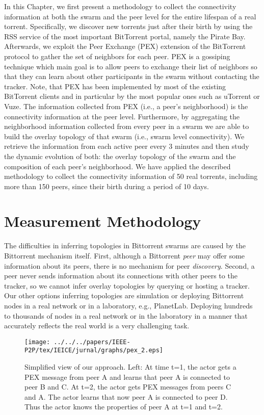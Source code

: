 In this Chapter, we first present a methodology to collect the connectivity information at both the swarm and the peer level for the entire lifespan of a real torrent. Specifically, we discover new torrents just after their birth by using the RSS service of the most important BitTorrent portal, namely the Pirate Bay. 
Afterwards, we exploit the Peer Exchange (PEX) extension of the BitTorrent protocol to gather the set of neighbors for each peer. 
PEX is a gossiping technique which main goal is to allow peers to exchange their list of neighbors so that they can learn about other participants in the swarm without contacting the tracker. 
Note, that PEX has been implemented by most of the existing BitTorrent clients and in particular by the most popular ones such as uTorrent or Vuze. 
The information collected from PEX (i.e., a peer’s neighborhood) is the connectivity information at the peer level. 
Furthermore, by aggregating the neighborhood information collected from every peer in a swarm we are able to build the overlay topology of that swarm (i.e., swarm level connectivity). 
We retrieve the information from each active peer every 3 minutes and then study the dynamic evolution of both: the overlay topology of the swarm and the composition of each peer’s neighborhood.
We have applied the described methodology to collect the connectivity information of 50 real torrents, including more than 150 peers, since their birth during a period of 10 days.

\section{Measurement Methodology}

The difficulties in inferring topologies in Bittorrent swarms are caused by the Bittorrent mechanism itself. 
First, although a Bittorrent \textit{peer} may offer some information about its peers, there is no mechanism for peer \textit{discovery}.  
Second, a peer never sends information about its connections with other peers to the tracker, so we cannot infer overlay topologies by querying or hosting a tracker.  
Our other options inferring topologies are simulation or deploying Bittorrent nodes in a real network or in a laboratory, e.g., PlanetLab. Deploying hundreds to thousands of nodes in a real network or in the laboratory in a manner that accurately reflects the real world is a very challenging task.

\begin{figure}[tb]
\begin{center}
\texttt{[image: ../../../papers/IEEE-P2P/tex/IEICE/jurnal/graphs/pex\_2.eps]}
\end{center}
\caption{Simplified view of our approach. Left: At time t=1, the actor gets a PEX message from peer A and
learns that peer A is connected to peer B and C. At t=2, the actor gets  PEX messages from peers C and A. The actor
learns that now peer A is connected to peer D. Thus the actor knows the properties of peer A at t=1 and t=2.} 
\label{fig:pexworks}
\end{figure}

